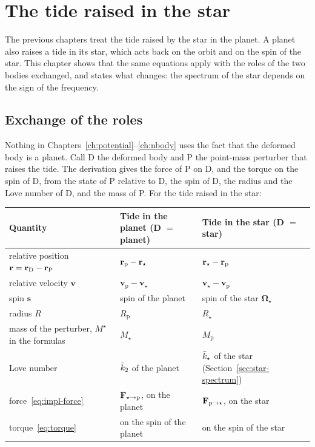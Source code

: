 \chapter{The tide raised in the star}\label{ch:star}

The previous chapters treat the tide raised by the star in the planet. A planet also raises a tide in its star, which acts back on the orbit and on the spin of the star. This chapter shows that the same equations apply with the roles of the two bodies exchanged, and states what changes: the spectrum of the star depends on the sign of the frequency.

\section{Exchange of the roles}\label{sec:star-roles}
Nothing in Chapters~\ref{ch:potential}--\ref{ch:nbody} uses the fact that the deformed body is a planet. Call D the deformed body and P the point-mass perturber that raises the tide. The derivation gives the force of P on D, and the torque on the spin of D, from the state of P relative to D, the spin of D, the radius and the Love number of D, and the mass of P. For the tide raised in the star:
\begin{center}\small
\renewcommand{\arraystretch}{1.25}
\begin{tabular}{p{5.6cm}p{4.2cm}p{4.2cm}}\toprule
Quantity & Tide in the planet (D $=$ planet) & Tide in the star (D $=$ star)\\\midrule
relative position $\mathbf r=\mathbf r_{\rm D}-\mathbf r_{\rm P}$ & $\mathbf r_{\mathrm p}-\mathbf r_\star$ & $\mathbf r_\star-\mathbf r_{\mathrm p}$\\
relative velocity $\mathbf v$ & $\mathbf v_{\mathrm p}-\mathbf v_\star$ & $\mathbf v_\star-\mathbf v_{\mathrm p}$\\
spin $\mathbf s$ & spin of the planet & spin of the star $\boldsymbol\Omega_\star$\\
radius $R$ & $R_{\mathrm p}$ & $R_\star$\\
mass of the perturber, $M^\star$ in the formulas & $M_\star$ & $M_{\mathrm p}$\\
Love number & $\bar k_2$ of the planet & $\bar k_\star$ of the star (Section~\ref{sec:star-spectrum})\\
force~\eqref{eq:impl-force} & $\mathbf F_{\star\to\mathrm p}$, on the planet & $\mathbf F_{{\rm p}\to\star}$, on the star\\
torque~\eqref{eq:torque} & on the spin of the planet & on the spin of the star\\\bottomrule
\end{tabular}
\end{center}
